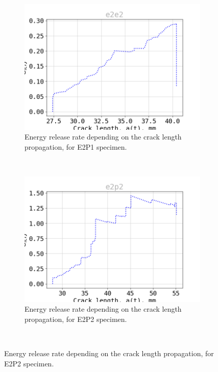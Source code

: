 \newpage
\begin{figure}[H]
\centering
\begin{subfigure}{0.48\linewidth}
	\centering
	\includegraphics[scale=0.3]{Figures/e2p1_G}
	\decoRule
	\caption[Energy release rate E2P1]{Energy release rate depending on the crack length propagation, for E2P1 specimen.}
	\label{fig:E2P1_G}
\end{subfigure}
\hfill\\
\begin{subfigure}{0.48\linewidth}
	\centering
	\includegraphics[scale=0.3]{Figures/e2p2_G}
	\decoRule
	\caption[Energy release rate E2P2]{Energy release rate depending on the crack length propagation, for E2P2 specimen.}
	\label{fig:E2P2_G}
\end{subfigure}
\hfill\\

\end{figure}
